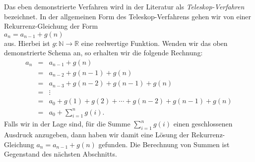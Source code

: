 Das eben demonstrierte Verfahren wird in der Literatur als \emph{Teleskop-Verfahren} bezeichnet.  In der
allgemeinen Form des Teleskop-Verfahrens gehen wir von einer Rekurrenz-Gleichung der Form
\\[0.2cm]
\hspace*{1.3cm}
$a_n = a_{n-1} + g(n)$
\\[0.2cm]
aus.  Hierbei ist $g: \mathbb{N} \rightarrow \mathbb{R}$ eine reelwertige Funktion.
Wenden wir das oben demonstrierte Schema an, so erhalten wir die folgende Rechnung:
\[ 
\begin{array}{lcl}  
  a_n & = & a_{n-1} + g(n) \\
      & = & a_{n-2} + g(n-1) + g(n) \\
      & = & a_{n-3} + g(n-2) + g(n-1) + g(n) \\
      & = & \vdots \\
      & = & a_{0} + g(1) + g(2) + \cdots  + g(n-2) + g(n-1) + g(n) \\[0.2cm]
      & = & a_0 + \sum\limits_{i=1}^{n} g(i).
\end{array}
\]
Falls wir in der Lage sind, f\"{u}r die Summe $\sum_{i=1}^{n} g(i)$ einen geschlossenen Ausdruck anzugeben,
dann haben wir damit eine L\"{o}sung der Rekurrenz-Gleichung $a_n = a_{n-1} + g(n)$
gefunden.  Die Berechnung von Summen ist Gegenstand des n\"{a}chsten Abschnitts.


